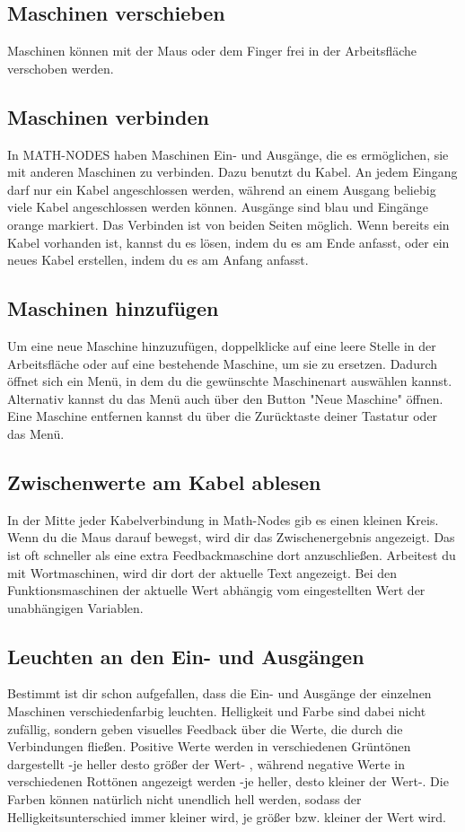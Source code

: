 \documentclass[12pt]{report}
\begin{document}
\subsection{Maschinen verschieben}
Maschinen können mit der Maus oder dem Finger frei in der Arbeitsfläche verschoben werden.
\subsection{Maschinen verbinden}
In MATH-NODES haben Maschinen Ein- und Ausgänge, die es ermöglichen, sie mit anderen Maschinen zu verbinden. Dazu benutzt du Kabel. An jedem Eingang darf nur ein Kabel angeschlossen werden, während an einem Ausgang beliebig viele Kabel angeschlossen werden können. Ausgänge sind blau und Eingänge orange markiert. Das Verbinden ist von beiden Seiten möglich. Wenn bereits ein Kabel vorhanden ist, kannst du es lösen, indem du es am Ende anfasst, oder ein neues Kabel erstellen, indem du es am Anfang anfasst.
\subsection{Maschinen hinzufügen}
Um eine neue Maschine hinzuzufügen, doppelklicke auf eine leere Stelle in der Arbeitsfläche oder auf eine bestehende Maschine, um sie zu ersetzen. Dadurch öffnet sich ein Menü, in dem du die gewünschte Maschinenart auswählen kannst. Alternativ kannst du das Menü auch über den Button "Neue Maschine" öffnen. Eine Maschine entfernen kannst du über die Zurücktaste deiner Tastatur oder das Menü.
\subsection{Zwischenwerte am Kabel ablesen}
In der Mitte jeder Kabelverbindung in Math-Nodes gib es einen kleinen Kreis. Wenn du die Maus darauf bewegst, wird dir das Zwischenergebnis angezeigt. Das ist oft schneller als eine extra Feedbackmaschine dort anzuschließen. Arbeitest du mit Wortmaschinen, wird dir dort der aktuelle Text angezeigt. Bei den Funktionsmaschinen der aktuelle Wert abhängig vom eingestellten Wert der unabhängigen Variablen. 
\subsection{Leuchten an den Ein- und Ausgängen}
Bestimmt ist dir schon aufgefallen, dass die Ein- und Ausgänge der einzelnen Maschinen verschiedenfarbig leuchten. Helligkeit und Farbe sind dabei nicht zufällig, sondern geben visuelles Feedback über die Werte, die durch die Verbindungen fließen. Positive Werte werden in verschiedenen Grüntönen dargestellt -je heller desto größer der Wert- , während negative Werte in verschiedenen Rottönen angezeigt werden -je heller, desto kleiner der Wert-. Die Farben können natürlich nicht unendlich hell werden, sodass der Helligkeitsunterschied immer kleiner wird, je größer bzw. kleiner der Wert wird.
\end{document}

